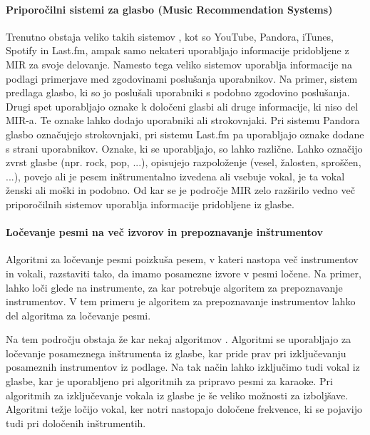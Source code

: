 \documentclass[a4paper, 12pt]{book}
\begin{document}
{\paragraph{Priporočilni sistemi za glasbo (Music Recommendation Systems)}

Trenutno obstaja veliko takih sistemov \cite{Song2012, bu2010music}, kot so YouTube, Pandora, iTunes, Spotify in Last.fm, ampak samo nekateri uporabljajo informacije pridobljene z MIR za svoje delovanje. Namesto tega veliko sistemov uporablja informacije na podlagi primerjave med zgodovinami poslušanja uporabnikov. Na primer, sistem predlaga glasbo, ki so jo poslušali uporabniki s podobno zgodovino poslušanja. Drugi spet uporabljajo oznake k določeni glasbi ali druge informacije, ki niso del MIR-a. Te oznake lahko dodajo uporabniki ali strokovnjaki. Pri sistemu Pandora glasbo označujejo strokovnjaki, pri sistemu Last.fm \cite{saari2013role} pa uporabljajo oznake dodane s strani uporabnikov. Oznake, ki se uporabljajo, so lahko različne. Lahko označijo zvrst glasbe (npr. rock, pop, ...), opisujejo razpoloženje (vesel, žalosten, sproščen, ...), povejo ali je pesem inštrumentalno izvedena ali vsebuje vokal, je ta vokal ženski ali moški in podobno. Od kar se je področje MIR zelo razširilo vedno več priporočilnih sistemov uporablja informacije pridobljene iz glasbe. 
 
\paragraph{Ločevanje pesmi na več izvorov in prepoznavanje inštrumentov}

Algoritmi za ločevanje pesmi poizkuša pesem, v kateri nastopa več instrumentov in vokali, razstaviti tako, da imamo posamezne izvore v pesmi ločene. Na primer, lahko loči glede na instrumente, za kar potrebuje algoritem za prepoznavanje instrumentov. V tem primeru je algoritem za prepoznavanje instrumentov lahko del algoritma za ločevanje pesmi.

Na tem področju obstaja že kar nekaj algoritmov \cite{Gillet2008,  Li2007}. Algoritmi se uporabljajo za ločevanje posameznega inštrumenta iz glasbe, kar pride prav pri izključevanju posameznih instrumentov iz podlage. Na tak način lahko izključimo tudi vokal iz glasbe, kar je uporabljeno pri algoritmih za pripravo pesmi za karaoke. Pri algoritmih za izključevanje vokala iz glasbe je še veliko možnosti za izboljšave. Algoritmi težje ločijo vokal, ker notri nastopajo določene frekvence, ki se pojavijo tudi pri določenih inštrumentih.  

}
\end{document}
